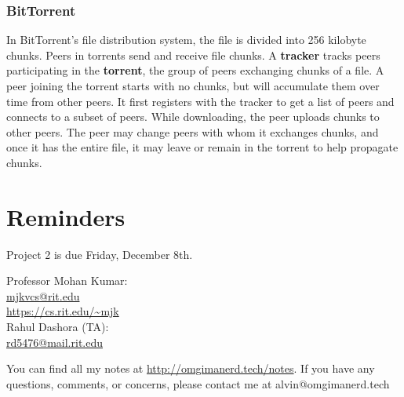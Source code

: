 \documentclass{math}
\begin{document}
\subsubsection*{BitTorrent}
In BitTorrent's file distribution system, the file is divided into 256 kilobyte
chunks. Peers in torrents send and receive file chunks. A \textbf{tracker}
tracks peers participating in the \textbf{torrent}, the group of peers
exchanging chunks of a file. A peer joining the torrent starts with no chunks,
but will accumulate them over time from other peers. It first registers with
the tracker to get a list of peers and connects to a subset of peers. While
downloading, the peer uploads chunks to other peers. The peer may change peers
with whom it exchanges chunks, and once it has the entire file, it may leave
or remain in the torrent to help propagate chunks.

\section*{Reminders}
Project 2 is due Friday, December 8th.

\noindent Professor Mohan Kumar: \\
\url{mjkvcs@rit.edu} \\
\url{https://cs.rit.edu/~mjk} \\

\noindent Rahul Dashora (TA): \\
\url{rd5476@mail.rit.edu} \\

\begin{center}
  You can find all my notes at \url{http://omgimanerd.tech/notes}. If you have
  any questions, comments, or concerns, please contact me at
  alvin@omgimanerd.tech
\end{center}
\end{document}
